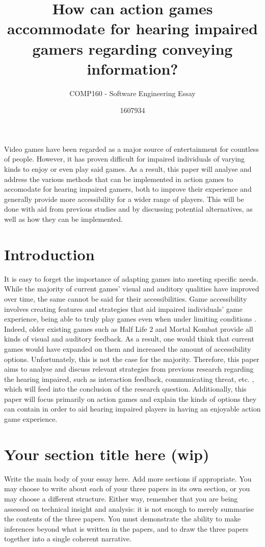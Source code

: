 \documentclass{scrartcl}
\title{How can action games accommodate for hearing impaired gamers regarding conveying information?}
\subtitle{COMP160 - Software Engineering Essay}
\author{1607934}
\begin{document}
\maketitle

\abstract
Video games have been regarded as a major source of entertainment for countless of people. However, it has proven difficult for impaired individuals of varying kinds to enjoy or even play said games. As a result, this paper will analyse and address the various methods that can be implemented in action games to accomodate for hearing impaired gamers, both to improve their experience and generally provide more accessibility for a wider range of players. This will be done with aid from previous studies and by discussing potential alternatives, as well as how they can be implemented.

\section{Introduction}
It is easy to forget the importance of adapting games into meeting specific needs. While the majority of current games' visual and auditory qualities have improved over time, the same cannot be said for their accessibilities. Game accessibility involves creating features and strategies that aid impaired individuals' game experience, being able to truly play games even when under limiting conditions \cite{11}. Indeed, older existing games such as Half Life 2 and Mortal Kombat provide all kinds of visual and auditory feedback. As a result, one would think that current games would have expanded on them and increased the amount of accessibility options. Unfortunately, this is not the case for the majority. Therefore, this paper aims to analyse and discuss relevant strategies from previous research regarding the hearing impaired, such as interaction feedback, communicating threat, etc. \cite{Denise}, which will feed into the conclusion of the research question. Additionally, this paper will focus primarily on action games and explain the kinds of options they can contain in order to aid hearing impaired players in having an enjoyable action game experience.

\section{Your section title here (wip)}

Write the main body of your essay here. Add more sections if appropriate. You may choose to write about each of your three papers in its own section, or you may choose a different structure. Either way, remember that you are being assessed on technical insight and analysis: it is not enough to merely summarise the contents of the three papers. You must demonstrate the ability to make inferences beyond what is written in the papers, and to draw the three papers together into a single coherent narrative.
\end{document}
